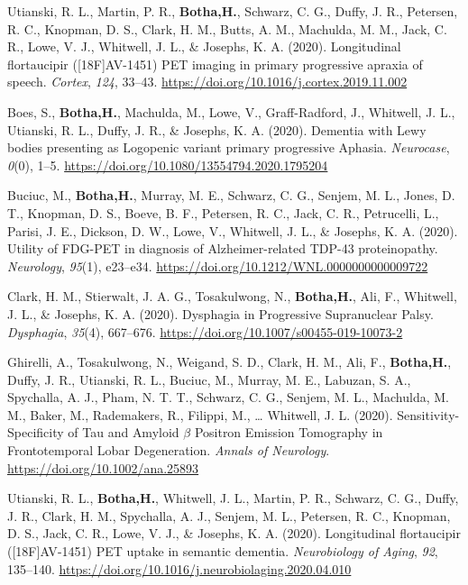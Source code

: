 \documentclass[11pt, a4paper]{awesome-cv}
\begin{document}
\leavevmode\hypertarget{ref-utianski_longitudinal_2020}{}%
Utianski, R. L., Martin, P. R., \textbf{Botha,H.}, Schwarz, C. G.,
Duffy, J. R., Petersen, R. C., Knopman, D. S., Clark, H. M., Butts, A.
M., Machulda, M. M., Jack, C. R., Lowe, V. J., Whitwell, J. L., \&
Josephs, K. A. (2020). Longitudinal flortaucipir ({[}{18F}{]}{AV}-1451)
{PET} imaging in primary progressive apraxia of speech. \emph{Cortex},
\emph{124}, 33--43. \url{https://doi.org/10.1016/j.cortex.2019.11.002}

\leavevmode\hypertarget{ref-boes_dementia_2020}{}%
Boes, S., \textbf{Botha,H.}, Machulda, M., Lowe, V., Graff-Radford, J.,
Whitwell, J. L., Utianski, R. L., Duffy, J. R., \& Josephs, K. A.
(2020). Dementia with {Lewy} bodies presenting as {Logopenic} variant
primary progressive {Aphasia}. \emph{Neurocase}, \emph{0}(0), 1--5.
\url{https://doi.org/10.1080/13554794.2020.1795204}

\leavevmode\hypertarget{ref-buciuc_utility_2020}{}%
Buciuc, M., \textbf{Botha,H.}, Murray, M. E., Schwarz, C. G., Senjem, M.
L., Jones, D. T., Knopman, D. S., Boeve, B. F., Petersen, R. C., Jack,
C. R., Petrucelli, L., Parisi, J. E., Dickson, D. W., Lowe, V.,
Whitwell, J. L., \& Josephs, K. A. (2020). Utility of {FDG}-{PET} in
diagnosis of {Alzheimer}-related {TDP}-43 proteinopathy.
\emph{Neurology}, \emph{95}(1), e23--e34.
\url{https://doi.org/10.1212/WNL.0000000000009722}

\leavevmode\hypertarget{ref-clark_dysphagia_2020}{}%
Clark, H. M., Stierwalt, J. A. G., Tosakulwong, N., \textbf{Botha,H.},
Ali, F., Whitwell, J. L., \& Josephs, K. A. (2020). Dysphagia in
{Progressive} {Supranuclear} {Palsy}. \emph{Dysphagia}, \emph{35}(4),
667--676. \url{https://doi.org/10.1007/s00455-019-10073-2}

\leavevmode\hypertarget{ref-ghirelli_sensitivity-specificity_2020}{}%
Ghirelli, A., Tosakulwong, N., Weigand, S. D., Clark, H. M., Ali, F.,
\textbf{Botha,H.}, Duffy, J. R., Utianski, R. L., Buciuc, M., Murray, M.
E., Labuzan, S. A., Spychalla, A. J., Pham, N. T. T., Schwarz, C. G.,
Senjem, M. L., Machulda, M. M., Baker, M., Rademakers, R., Filippi, M.,
\ldots{} Whitwell, J. L. (2020). Sensitivity-{Specificity} of {Tau} and
{Amyloid} \(\beta\) {Positron} {Emission} {Tomography} in
{Frontotemporal} {Lobar} {Degeneration}. \emph{Annals of Neurology}.
\url{https://doi.org/10.1002/ana.25893}

\leavevmode\hypertarget{ref-utianski_longitudinal_2020-1}{}%
Utianski, R. L., \textbf{Botha,H.}, Whitwell, J. L., Martin, P. R.,
Schwarz, C. G., Duffy, J. R., Clark, H. M., Spychalla, A. J., Senjem, M.
L., Petersen, R. C., Knopman, D. S., Jack, C. R., Lowe, V. J., \&
Josephs, K. A. (2020). Longitudinal flortaucipir ({[}{18F}{]}{AV}-1451)
{PET} uptake in semantic dementia. \emph{Neurobiology of Aging},
\emph{92}, 135--140.
\url{https://doi.org/10.1016/j.neurobiolaging.2020.04.010}
\end{document}
